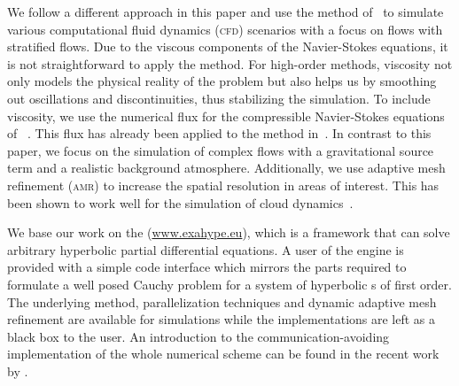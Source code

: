 \documentclass[runningheads]{llncs}
\begin{document}
We follow a different approach in this paper and use the \aderdg{} method of~\cite{dumbser2008unified} to simulate various computational fluid dynamics (\textsc{cfd}) scenarios with a focus on flows with stratified flows.
Due to the viscous components of the Navier-Stokes equations, it is not straightforward to apply the \dg{} method.
For high-order \dg{} methods, viscosity not only models the physical reality of the problem but also helps us by smoothing out oscillations and discontinuities, thus stabilizing the simulation.
To include viscosity, we use the numerical flux for the compressible Navier-Stokes equations of \citeauthor{gassner2008discontinuous}~\cite{gassner2008discontinuous}.
This flux has already been applied to the \aderdg{} method in~\cite{dumbser2010arbitrary}.
In contrast to this paper, we focus on the simulation of complex flows with a gravitational source term and a realistic background atmosphere.
Additionally, we use adaptive mesh refinement (\textsc{amr}) to increase the spatial resolution in areas of interest.
This has been shown to work well for the simulation of cloud dynamics~\cite{muller2010adaptive}.

We base our work on the \exahypeengine{} (\url{www.exahype.eu}), which is a framework that can solve arbitrary hyperbolic partial differential equations.
A user of the engine is provided with a simple code interface which mirrors the parts required to formulate a well posed Cauchy problem for a system of hyperbolic \pde{}s of first order.
The underlying \aderdg{} method, parallelization techniques and dynamic adaptive mesh refinement are available for simulations while the implementations are left as a black box to the user.
An introduction to the communication-avoiding implementation of the whole numerical scheme can be found in the recent work~\cite{charrier2018stop} by \citeauthor{charrier2018stop}.
\end{document}
